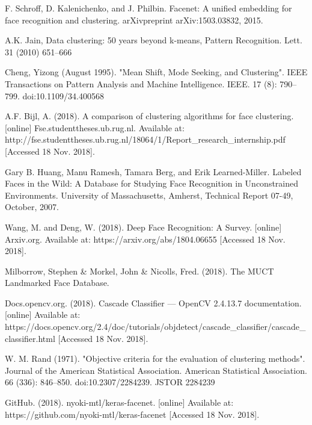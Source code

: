\documentclass[conference]{IEEEtran}
\begin{document}
\begin{thebibliography}{00}

 F. Schroff, D. Kalenichenko, and J. Philbin. Facenet: A unified embedding for face recognition and clustering. arXivpreprint arXiv:1503.03832, 2015.

 A.K. Jain, Data clustering: 50 years beyond k-means, Pattern Recognition. Lett. 31
(2010) 651–666

 Cheng, Yizong (August 1995). "Mean Shift, Mode Seeking, and Clustering". IEEE Transactions on Pattern Analysis and Machine Intelligence. IEEE. 17 (8): 790–799. doi:10.1109/34.400568

 A.F. Bijl, A. (2018). A comparison of clustering algorithms for face clustering. [online] Fse.studenttheses.ub.rug.nl. Available at: http://fse.studenttheses.ub.rug.nl/18064/1/Report\_research\_internship.pdf [Accessed 18 Nov. 2018].

 Gary B. Huang, Manu Ramesh, Tamara Berg, and Erik Learned-Miller.
Labeled Faces in the Wild: A Database for Studying Face Recognition in Unconstrained Environments.
University of Massachusetts, Amherst, Technical Report 07-49, October, 2007.

 Wang, M. and Deng, W. (2018). Deep Face Recognition: A Survey. [online] Arxiv.org. Available at: https://arxiv.org/abs/1804.06655 [Accessed 18 Nov. 2018].

 Milborrow, Stephen \& Morkel, John \& Nicolls, Fred. (2018). The MUCT Landmarked Face Database.

 Docs.opencv.org. (2018). Cascade Classifier — OpenCV 2.4.13.7 documentation. [online] Available at: https://docs.opencv.org/2.4/doc/tutorials/objdetect/cascade\_classifier/cascade\_classifier.html [Accessed 18 Nov. 2018].

 W. M. Rand (1971). "Objective criteria for the evaluation of clustering methods". Journal of the American Statistical Association. American Statistical Association. 66 (336): 846–850. doi:10.2307/2284239. JSTOR 2284239

 GitHub. (2018). nyoki-mtl/keras-facenet. [online] Available at: https://github.com/nyoki-mtl/keras-facenet [Accessed 18 Nov. 2018].

\end{thebibliography}
\end{document}
